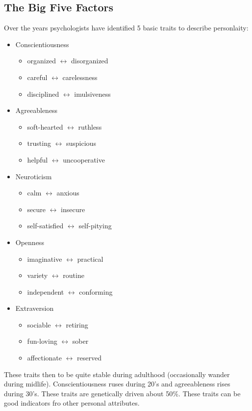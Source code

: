 \documentclass[12pt]{article}
\begin{document}
\subsection*{The Big Five Factors}
Over the years psychologists have identified 5 basic traits to describe personlaity:
\begin{itemize}
\item Conscientiousness
	\begin{itemize}
	\item organized $\longleftrightarrow$ disorganized
	\item careful $\longleftrightarrow$ carelessness
	\item disciplined $\longleftrightarrow$ imulsiveness
	\end{itemize}
\item Agreeableness
	\begin{itemize}
	\item soft-hearted $\longleftrightarrow$ ruthless
	\item trusting $\longleftrightarrow$ suspicious
	\item helpful $\longleftrightarrow$ uncooperative
	\end{itemize}
\item Neuroticism
	\begin{itemize}
	\item calm $\longleftrightarrow$ anxious
	\item secure $\longleftrightarrow$ insecure
	\item self-satisfied $\longleftrightarrow$ self-pitying
	\end{itemize}
\item Openness
	\begin{itemize}
	\item imaginative $\longleftrightarrow$ practical
	\item variety $\longleftrightarrow$ routine
	\item independent $\longleftrightarrow$ conforming
	\end{itemize}
\item Extraversion
	\begin{itemize}
	\item sociable $\longleftrightarrow$ retiring
	\item fun-loving $\longleftrightarrow$ sober
	\item affectionate $\longleftrightarrow$ reserved
	\end{itemize}
\end{itemize}
These traits then to be quite stable during adulthood (occasionally wander during midlife). Conscientiousness ruses during 20's and agreeableness rises during 30's. These traits are genetically driven about 50\%. These traits can be good indicators fro other personal attributes. 
\end{document}

